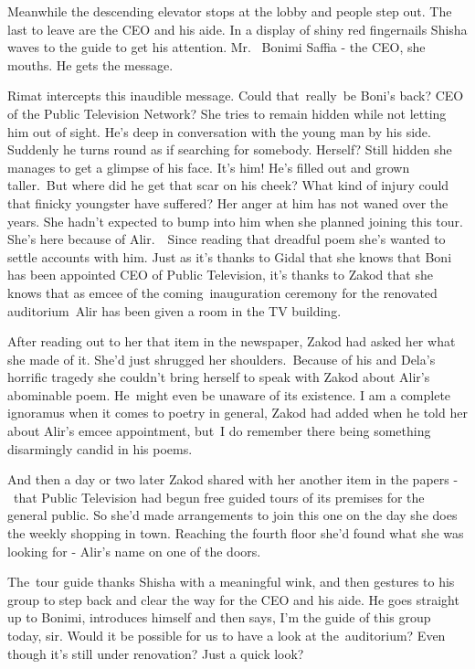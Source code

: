 \documentclass[twoside,11pt]{book}
\begin{document}
Meanwhile the descending elevator stops at the lobby and people step out. The last to leave are the CEO and his aide. In
a display of shiny red fingernails Shisha waves to the guide to get his attention. {\textquotedbl}Mr. ~Bonimi Saffia -
the CEO,{\textquotedbl} she mouths. He gets the message. 

Rimat intercepts this inaudible message. Could that~really~be Boni's back? CEO of the Public Television Network? She
tries to remain hidden while not letting him out of sight. He's deep in conversation with the young man by his side.
Suddenly he turns round as if searching for somebody. Herself? Still hidden she manages to get a glimpse of his face.
It's him! He{}'s filled out and grown taller.\ But where did he get that scar on his cheek? What kind of injury could
that finicky youngster have suffered? Her anger at him has not waned over the years. She hadn't expected to bump into
him when she planned joining this tour{.} She's here because of
Alir.\ \ Since reading that dreadful poem she's wanted to settle accounts with him. Just as it's thanks to Gidal that
she knows that Boni has been appointed CEO of Public Television, it's thanks to Zakod that she knows that as emcee of
the coming{\ }inauguration ceremony for the renovated auditorium\ Alir
has been given a room in the TV building. 

After reading out to her that item in the newspaper, Zakod had asked her what she made of it. She'd just shrugged her
shoulders.\ Because of his and Dela's horrific tragedy she couldn't bring herself to speak with Zakod about Alir's
abominable poem. He\ might even be unaware of its existence. {\textquotedbl}I am a complete ignoramus when it comes to
poetry in general,{\textquotedbl} Zakod had added when he told her about Alir's emcee appointment, {\textquotedbl}but~I
do remember there being something disarmingly candid in his poems{\textquotedbl}. \ 

And then a day or two later Zakod shared with her another item in the papers -\ that Public Television had begun free
guided tours of its premises for the general public. So she'd made arrangements to join this one on the day she does
the weekly shopping in town. Reaching the fourth floor she'd found what she was looking for - Alir's name on one of the
doors.\ 

The~tour guide thanks Shisha with a meaningful wink, and then gestures to his group to step back and clear the way for
the CEO and his aide. He goes straight up to Bonimi, introduces himself and then says, {\textquotedbl}I'm the guide of
this group today, sir. Would it be possible for us to have a look at the~auditorium? Even though it's still under
renovation? Just a quick look?{\textquotedbl} 
\end{document}
